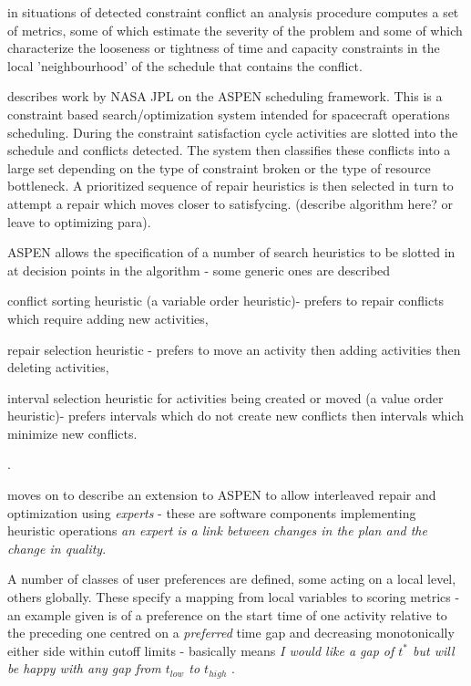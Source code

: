 in situations of detected constraint conflict an analysis procedure computes a set of metrics, some of which estimate the severity of the problem and some of which characterize the looseness or tightness of time and capacity constraints in the local 'neighbourhood' of the schedule that contains the conflict.


\cite{rabideau99iterative} describes work by NASA JPL on the ASPEN scheduling framework. This is a constraint based search/optimization system intended for spacecraft operations scheduling. During the constraint satisfaction cycle activities are slotted into the schedule and conflicts detected. The system then classifies these conflicts into a large set depending on the type of constraint broken or the type of resource bottleneck. A prioritized sequence of repair heuristics is then selected in turn to attempt a repair which moves closer to satisfycing. (describe algorithm here? or leave to optimizing para).

 ASPEN allows the specification of a number of search heuristics to be slotted in at decision points in the algorithm - some generic ones are described \begin{inparaenum} \item conflict sorting heuristic (a variable order heuristic)- prefers to repair conflicts which require adding new activities, \item repair selection heuristic - prefers to move an activity then adding activities then deleting activities, \item interval selection heuristic for activities being created or moved (a value order heuristic)- prefers intervals which do not create new conflicts then intervals which minimize new conflicts. \end{inparaenum}.

\cite{rabideau00generic} moves on to describe an extension to ASPEN to allow interleaved repair and optimization using \emph{experts} - these are software components implementing heuristic operations \emph{an expert is a link between changes in the plan and the change in quality}. 

A number of classes of user preferences are defined, some acting on a local level, others globally. These specify a mapping from local variables to scoring metrics - an example given is of a preference on the start time of one activity relative to the preceding one centred on a \emph{preferred} time gap and decreasing monotonically either side within cutoff limits - basically means \emph{I would like a gap of $t^*$ but will be happy with any gap from $t_{low}$ to $t_{high}$} . 

